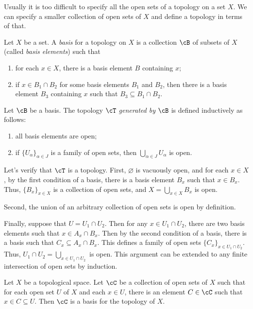 \documentclass{amsart}
\begin{document}
Usually it is too difficult to specify all the open sets of a topology on a set $X$.
We can specify a smaller collection of open sets of $X$ and define a topology in terms of that.
\begin{defn}
  Let $X$ be a set.
  A \emph{basis} for a topology on $X$ is a collection $\cB$ of subsets of $X$ (called \emph{basis elements}) such that
  \begin{enumerate}
  \item for each $x \in X$, there is a basis element $B$ containing $x$;
  \item if $x \in B_{1} \cap B_{2}$ for some basis elements $B_{1}$ and $B_{2}$, then there is a basis element $B_{3}$ containing $x$ such that $B_{3} \subseteq B_{1} \cap B_{2}$.
  \end{enumerate}
\end{defn}

\begin{defn}
  Let $\cB$ be a basis.
  The topology $\cT$ \emph{generated by} $\cB$ is defined inductively as follows:
  \begin{enumerate}
  \item all basis elements are open;
  \item if $\{U_{\alpha}\}_{\alpha \in J}$ is a family of open sets, then $\bigcup_{\alpha \in J}U_{\alpha}$ is open.
  \end{enumerate}
\end{defn}

Let's verify that $\cT$ is a topology.
First, $\varnothing$ is vacuously open, and for each $x \in X$, by the first condition of a basis, there is a basis element $B_{x}$ such that $x \in B_{x}$.
Thus, $\{B_{x}\}_{x \in X}$ is a collection of open sets, and $X = \bigcup_{x \in X}B_{x}$ is open.

Second, the union of an arbitrary collection of open sets is open by definition.

Finally, suppose that $U = U_{1} \cap U_{2}$.
Then for any $x \in U_{1} \cap U_{2}$, there are two basis elements such that $x \in A_{x} \cap B_{x}$.
Then by the second condition of a basis, there is a basis such that $C_{x} \subseteq A_{x} \cap B_{x}$.
This defines a family of open sets $\{C_{x}\}_{x \in U_{1} \cap U_{2}}$.
Thus, $U_{1} \cap U_{2} = \bigcup_{x \in U_{1} \cap U_{2}}$ is open.
This argument can be extended to any finite intersection of open sets by induction.

\begin{lem}
  Let $X$ be a topological space.
  Let $\cC$ be a collection of open sets of $X$ such that for each open set $U$ of $X$ and each $x \in U$, there is an element $C \in \cC$ such that $x \in C \subseteq U$.
  Then $\cC$ is a basis for the topology of $X$.
\end{lem}
\end{document}

